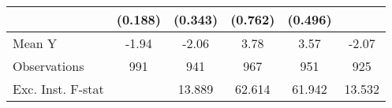 {\begin{tabular}{l*{5}{c}}
            &     (0.188)         &     (0.343)         &     (0.762)         &     (0.496)         &                     \\
\midrule
Mean Y      &       -1.94         &       -2.06         &        3.78         &        3.57         &       -2.07         \\
Observations&         991         &         941         &         967         &         951         &         925         \\
Exc. Inst. F-stat&                     &      13.889         &      62.614         &      61.942         &      13.532         \\
\bottomrule
\end{tabular}
}

